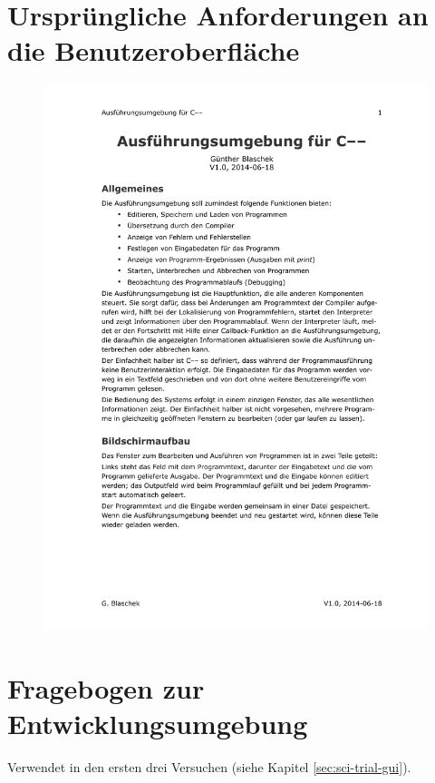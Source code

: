 \documentclass[11pt, oneside]{book}   		%
\begin{document}
\pagebreak

\section{Ursprüngliche Anforderungen an die Benutzeroberfläche}
\label{app:anf-gui}

\begin{figure}[h!]
	\centering
	\includegraphics[width=1.0\textwidth]{./media/docs/Anforderung-gui.pdf}
\end{figure}

\pagebreak
\section{Fragebogen zur Entwicklungsumgebung}
Verwendet in den ersten drei Versuchen (siehe Kapitel \ref{sec:sci-trial-gui}).
\end{document}
